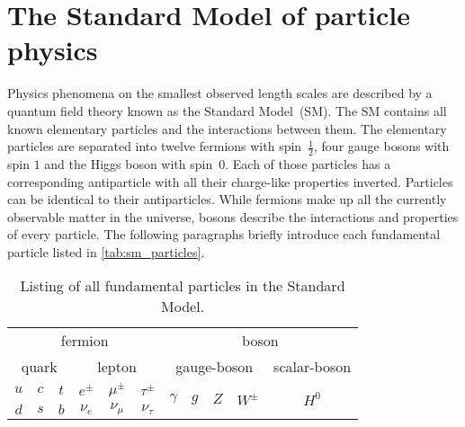 \section{The Standard Model of particle physics}

Physics phenomena on the smallest observed length scales are described by a quantum field theory known as the Standard Model~(SM).
The SM contains all known elementary particles and the interactions between them.
The elementary particles are separated into twelve fermions with spin~$\frac{1}{2}$, four gauge bosons with spin $1$ and the Higgs boson with spin~$0$.
Each of those particles has a corresponding antiparticle with all their charge-like properties inverted.
Particles can be identical to their antiparticles.
While fermions make up all the currently observable matter in the universe, bosons describe the interactions and properties of every particle.
The following paragraphs briefly introduce each fundamental particle listed in \autoref{tab:sm_particles}.

\begin{table}
    \centering
    \caption{Listing of all fundamental particles in the Standard Model.}
    \begin{tabular}{c c c | c c c | c c c c | c}
        \toprule
        \multicolumn{6}{c|}{fermion} & \multicolumn{5}{c}{boson} \\
        \multicolumn{3}{c}{quark} & \multicolumn{3}{c|}{lepton} & \multicolumn{4}{c}{gauge-boson} & \multicolumn{1}{c}{scalar-boson} \\
        \midrule
        $u$ & $c$ & $t$ & $e^\pm$ & $\mu^\pm$ & $\tau^\pm$ & \multirow{2}{*}{$\gamma$} & \multirow{2}{*}{$g$} & \multirow{2}{*}{$Z$} & \multirow{2}{*}{$W^\pm$} & \multirow{2}{*}{$H^0$} \\
        $d$ & $s$ & $b$ & $\nu_e$ & $\nu_\mu$ & $\nu_\tau$ &&&&& \\
        \bottomrule
    \end{tabular}
    \label{tab:sm_particles}
\end{table}

